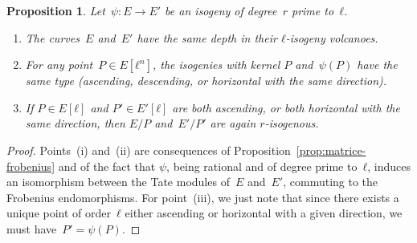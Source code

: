 \documentclass{lms}
\newtheorem{prop}[thm]{Proposition}
\begin{document}
\begin{prop}\label{prop:isogenie-premiere}
Let~$ψ: E → E'$ be an isogeny of degree~$r$ prime to~$ℓ$.
\begin{enumerate}
\item The curves~$E$ and~$E'$ have the same depth
in their $ℓ$-isogeny volcanoes.
\item For any point~$P ∈ E[ℓ^n]$,
the isogenies with kernel $P$ and~$ψ(P)$ have the same type
(ascending, descending, or horizontal with the same direction).
\item If $P ∈ E[ℓ]$ and $P' ∈ E'[ℓ]$ are both ascending,
or both horizontal with the same direction,
then $E/P$ and~$E'/P'$ are again $r$-isogenous.
\end{enumerate}
\end{prop}
\begin{proof}
Points~(i) and~(ii) are consequences of Proposition~\ref{prop:matrice-frobenius}
and of the fact that $ψ$, being rational and of degree prime to~$ℓ$,
induces an isomorphism between the Tate modules of~$E$ and~$E'$,
commuting to the Frobenius endomorphisms.
For point~(iii), we just note that
since there exists a unique point of order~$ℓ$
either ascending or horizontal with a given direction,
we must have~$P' = ψ(P)$.
\end{proof}
\end{document}
